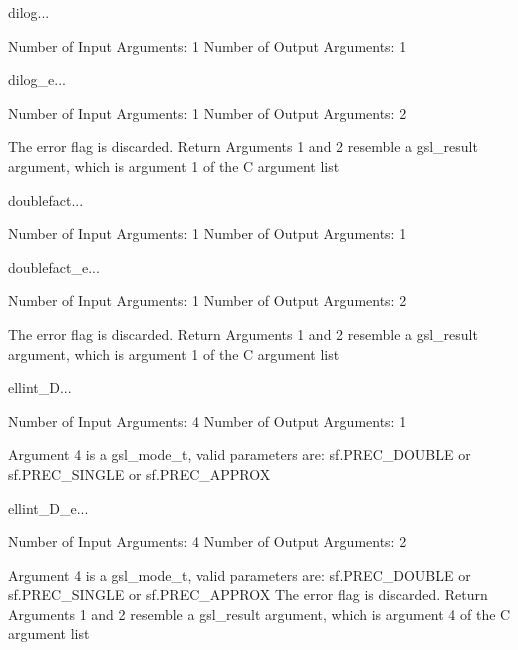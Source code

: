 \begin{funcdesc}{dilog}{...}

    Number of Input  Arguments:  1
    Number of Output Arguments:  1
\end{funcdesc}

\begin{funcdesc}{dilog_e}{...}

    Number of Input  Arguments:  1
    Number of Output Arguments:  2

The error flag is discarded.
Return Arguments 1 and 2 resemble a gsl_result argument,
	which is  argument 1 of the C argument list

\end{funcdesc}

\begin{funcdesc}{doublefact}{...}

    Number of Input  Arguments:  1
    Number of Output Arguments:  1
\end{funcdesc}

\begin{funcdesc}{doublefact_e}{...}

    Number of Input  Arguments:  1
    Number of Output Arguments:  2

The error flag is discarded.
Return Arguments 1 and 2 resemble a gsl_result argument,
	which is  argument 1 of the C argument list

\end{funcdesc}

\begin{funcdesc}{ellint_D}{...}

    Number of Input  Arguments:  4
    Number of Output Arguments:  1

 Argument 4 is a gsl_mode_t, valid parameters are:
	sf.PREC_DOUBLE or sf.PREC_SINGLE or sf.PREC_APPROX

\end{funcdesc}

\begin{funcdesc}{ellint_D_e}{...}

    Number of Input  Arguments:  4
    Number of Output Arguments:  2

 Argument 4 is a gsl_mode_t, valid parameters are:
	sf.PREC_DOUBLE or sf.PREC_SINGLE or sf.PREC_APPROX
The error flag is discarded.
Return Arguments 1 and 2 resemble a gsl_result argument,
	which is  argument 4 of the C argument list

\end{funcdesc}

